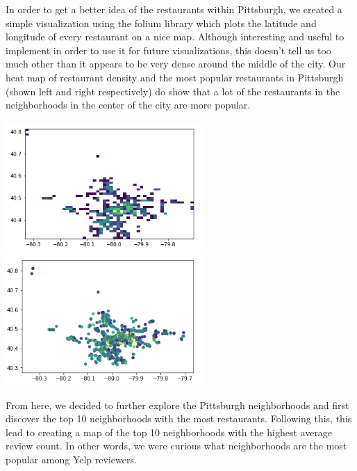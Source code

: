 \documentclass{neu_handout}
\begin{document}
In order to get a better idea of the restaurants within Pittsburgh, we created a simple visualization using the folium library which plots the latitude and longitude of every restaurant on a nice map. Although interesting and useful to implement in order to use it for future visualizations, this doesn't tell us too much other than it appears to be very dense around the middle of the city. Our heat map of restaurant density and the most popular restaurants in Pittsburgh (shown left and right respectively) do show that a lot of the restaurants in the neighborhoods in the center of the city are more popular.

\begin{center}
\includegraphics[width=75mm,scale=0.5]{pa_rest_density}
\includegraphics[width=75mm,scale=0.5]{pa_popular_restaurants}
\end{center}

From here, we decided to further explore the Pittsburgh neighborhoods and first discover the top 10 neighborhoods with the most restaurants. Following this, this lead to creating a map of the top 10 neighborhoods with the highest average review count. In other words, we were curious what neighborhoods are the most popular among Yelp reviewers.
\end{document}

